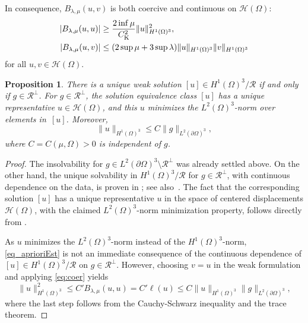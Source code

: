 \documentclass[reqno]{amsart}
\numberwithin{equation}{section}
\numberwithin{figure}{section}
\numberwithin{table}{section}
\newcommand{\norm}[1]{\lVert#1\rVert}
\newcommand{\abs}[1]{\lvert#1\rvert}
\theoremstyle{definition}
\theoremstyle{plain}
\newtheorem{prop}[thm]{Proposition}
\theoremstyle{definition}
\theoremstyle{remark}
\numberwithin{equation}{section}
\begin{document}
In consequence, $B_{\lambda, \mu}(u,v)$ is both coercive and continuous on $\mathcal{H}(\Omega)$:
%
\begin{align}  
	\abs{B_{\lambda, \mu}(u,u)} &\geq \frac{2 \inf \mu}{C_{\rm K}^2} \norm{u}_{H^1(\Omega)^3}^2, \label{eq:coer} \\
	\abs{B_{\lambda, \mu}(u,v)} &\leq ( 2 \sup\mu + 3 \sup \lambda ) \norm{u}_{H^1(\Omega)^3} \norm{v}_{H^1(\Omega)^3} \label{eq:cont}
\end{align}
%
for all $u, v \in \mathcal{H}(\Omega)$.

\begin{prop} \label{prop_wellposedness}
	There is a unique weak solution $[u] \in  H^1(\Omega)^3 / \mathcal{R}$ if and only if $g\in\mathcal{R}^{\perp}$. For $g\in\mathcal{R}^{\perp}$, the solution equivalence class $[u]$ has a unique representative $u\in\mathcal H(\Omega)$, and this $u$ minimizes the $L^2(\Omega)^3$-norm over elements in~$[u]$. Moreover, 
	\begin{equation}  \label{eq_aprioriEst}
		\norm{u}_{H^1(\Omega)^3} \leq C\norm{g}_{L^2(\partial\Omega)^3},
	\end{equation}
	where $C = C(\mu, \Omega) > 0$ is independent of $g$.
\end{prop}

\begin{proof} 
	The insolvability for $g \in L^2(\partial \Omega)^3 \setminus \mathcal{R}^\perp$ was already settled above. On the other hand, the unique solvability in $H^1(\Omega)^3 / \mathcal{R}$ for $g \in \mathcal{R}^\perp$, with continuous dependence on the data, is proven in \cite{Ciarlet78}; see also~\cite[theorem~3.4]{Kaleem26}. The fact that the corresponding solution $[u]$ has a unique representative $u$ in the space of centered displacements $\mathcal{H}(\Omega)$, with the claimed $L^2(\Omega)^3$-norm minimization property, follows directly from \cite[lemmas~5.2 \& 5.3]{Kaleem26}.
	
	As $u$ minimizes the $L^2(\Omega)^3$-norm instead of the $H^1(\Omega)^3$-norm, \eqref{eq_aprioriEst} is not an immediate consequence of the continuous dependence of $[u] \in H^1(\Omega)^3 / \mathcal{R}$ on $g \in \mathcal{R}^\perp$. However, choosing $v = u$ in the weak formulation and applying \eqref{eq:coer} yields
	\begin{equation*}
		\norm{u}_{H^1(\Omega)^3}^2 \leq  C' B_{\lambda,\mu}(u,u) = C' \ell(u) \leq C \norm{u}_{H^1(\Omega)^3} \norm{g}_{L^2(\partial \Omega)^3}, 
	\end{equation*}
	where the last step follows from the Cauchy-Schwarz inequality and the trace theorem.
\end{proof}
\end{document}
